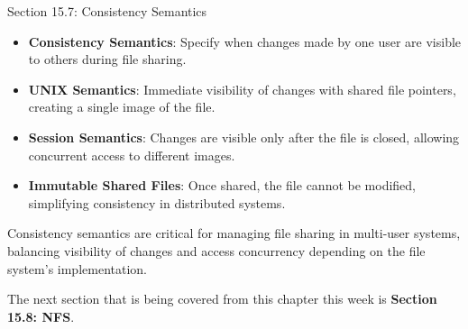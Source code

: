 \begin{notes}{Section 15.7: Consistency Semantics}
\begin{highlight}
    \end{highlight}
    
    \begin{highlight}
    
        \begin{itemize}
            \item \textbf{Consistency Semantics}: Specify when changes made by one user are visible to others during file sharing.
            \item \textbf{UNIX Semantics}: Immediate visibility of changes with shared file pointers, creating a single image of the file.
            \item \textbf{Session Semantics}: Changes are visible only after the file is closed, allowing concurrent access to different images.
            \item \textbf{Immutable Shared Files}: Once shared, the file cannot be modified, simplifying consistency in distributed systems.
        \end{itemize}
    
    Consistency semantics are critical for managing file sharing in multi-user systems, balancing visibility of changes and access concurrency depending on the file system's implementation.
    
    \end{highlight}
\end{notes}

The next section that is being covered from this chapter this week is \textbf{Section 15.8: NFS}.

